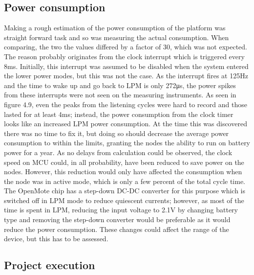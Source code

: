 \subsection{Power consumption}

Making a rough estimation of the power consumption of the platform was straight forward task and so was measuring the actual consumption.
When comparing,
	the two the values differed by a factor of 30,
	which was not expected.
The reason probably originates from the clock interrupt which is triggered every 8ms.
Initially,
	this interrupt was assumed to be disabled when the system entered the lower power modes,
	but this was not the case.
As the interrupt fires at 125Hz and the time to wake up and go back to LPM is only 272μs,
	the power spikes from these interrupts were not seen on the measuring instruments.
As seen in figure 4.9,
	even the peaks from the listening cycles were hard to record and those lasted for at least 4ms;
	instead,
	the power consumption from the clock timer looks like an increased LPM power consumption.
At the time this was discovered there was no time to fix it,
	but doing so should decrease the average power consumption to within the limits,
	granting the nodes the ability to run on battery power for a year.
As no delays from calculation could be observed,
	the clock speed on MCU could,
	in all probability,
	have been reduced to save power on the nodes.
However,
	this reduction would only have affected the consumption when the node was in active mode,
	which is only a few percent of the total cycle time.
The OpenMote chip has a step-down DC-DC converter for this purpose which is switched off in LPM mode to reduce quiescent currents;
	however,
	as most of the time is spent in LPM,
	reducing the input voltage to 2.1V by changing battery type and removing the step-down converter would be preferable as it would reduce the power consumption.
These changes could affect the range of the device,
	but this has to be assessed.

\subsection{Project execution}

